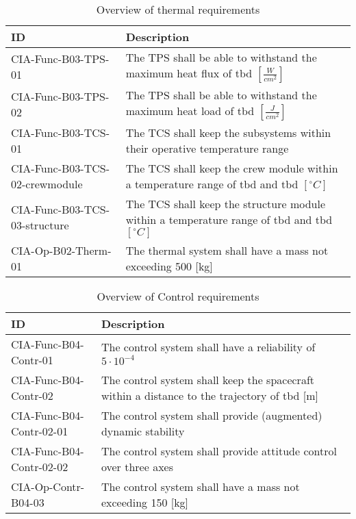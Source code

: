 \begin{table}[H]
	\caption*{Overview of thermal requirements}
	\begin{tabular}{|p{}|p{}|}
    \hline
    ID          & Description                                                                                                      \\ \hline \hline
   CIA-Func-B03-TPS-01 & The TPS shall be able to withstand the maximum heat flux of \gls{tbd} $ \left[\frac{W}{cm^2}\right] $               
\\ \hline
    CIA-Func-B03-TPS-02 &  The TPS shall be able to withstand the maximum heat load of \gls{tbd} $ \left[\frac{J}{cm^2}\right] $               
\\ \hline
    CIA-Func-B03-TCS-01 & The TCS shall keep the subsystems within their operative temperature range                                            
\\ \hline
    CIA-Func-B03-TCS-02-crewmodule & The TCS shall keep the crew module within a temperature range of \gls{tbd} and \gls{tbd} $ \left[^{\circ}C\right] $                                        
\\ \hline
    CIA-Func-B03-TCS-03-structure & The TCS shall keep the structure module within a temperature range of \gls{tbd} and \gls{tbd} $ \left[^{\circ}C\right] $                                        
\\ \hline
	CIA-Op-B02-Therm-01 	&	The thermal system shall have a mass not exceeding 500 [kg]  							\\ \hline
    \end{tabular}
    \label{tab:thermalreq}
\end{table}

\begin{table}[H]
	\caption*{Overview of Control requirements}
	\begin{tabular}{|p{}|p{}|}
		\hline
		ID         					&	Description																							\\ \hline \hline
		CIA-Func-B04-Contr-01		&	The control system shall have a reliability of $5 \cdot 10^{-4}$            									\\ \hline
		CIA-Func-B04-Contr-02 		&	The control system shall keep the spacecraft within a distance to the trajectory of \gls{tbd} [m]	\\ \hline	
		CIA-Func-B04-Contr-02-01 	&	The control system shall provide (augmented) dynamic stability       								\\ \hline
		CIA-Func-B04-Contr-02-02 	&	The control system shall provide attitude control over three axes         							\\ \hline	
		CIA-Op-Contr-B04-03	&	The control system shall have a mass not exceeding 150 [kg]  							\\ \hline
	\end{tabular}
	\label{tab:controlreq}
\end{table}
